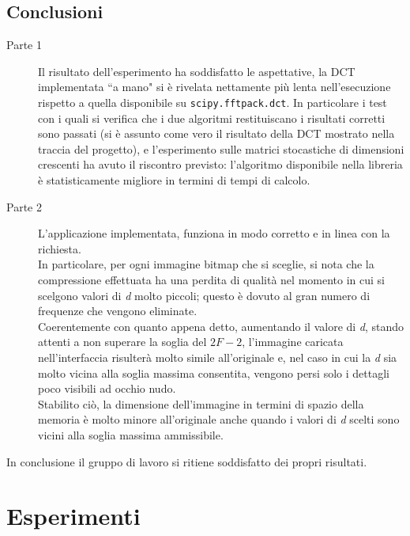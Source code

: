 \documentclass[preprint,12pt]{elsarticle}
\begin{document}
\newpage

\subsection*{Conclusioni}

\begin{description}
\item[Parte 1] Il risultato dell'esperimento ha soddisfatto le aspettative, la DCT implementata “a mano" si è rivelata nettamente più lenta nell'esecuzione rispetto a quella disponibile su \texttt{scipy.fftpack.dct}.
In particolare i test con i quali si verifica che i due algoritmi restituiscano i risultati corretti sono passati (si è assunto come vero il risultato della DCT mostrato nella traccia del progetto), e l'esperimento sulle matrici stocastiche di dimensioni crescenti ha avuto il riscontro previsto: l'algoritmo disponibile nella libreria è statisticamente migliore in termini di tempi di calcolo.
	
\item[Parte 2] L'applicazione implementata, funziona in modo corretto e in linea con la richiesta. \\In particolare, per ogni immagine bitmap che si sceglie, si nota che la compressione effettuata ha una perdita di qualità nel momento in cui si scelgono valori di \textit{d} molto piccoli; questo è dovuto al gran numero di frequenze che vengono eliminate.\\ Coerentemente con quanto appena detto, aumentando il valore di \textit{d}, stando attenti a non superare la soglia del $2F-2$, l'immagine caricata nell'interfaccia risulterà molto simile all'originale e, nel caso in cui la \textit{d} sia molto vicina alla soglia massima consentita, vengono persi solo i dettagli poco visibili ad occhio nudo.\\
Stabilito ciò, la dimensione dell'immagine in termini di spazio della memoria è molto minore all'originale anche quando i valori di \textit{d} scelti sono vicini alla soglia massima ammissibile. 
\end{description}

In conclusione il gruppo di lavoro si ritiene soddisfatto dei propri risultati.

\newpage
\appendix

\section{Esperimenti}
\end{document}
